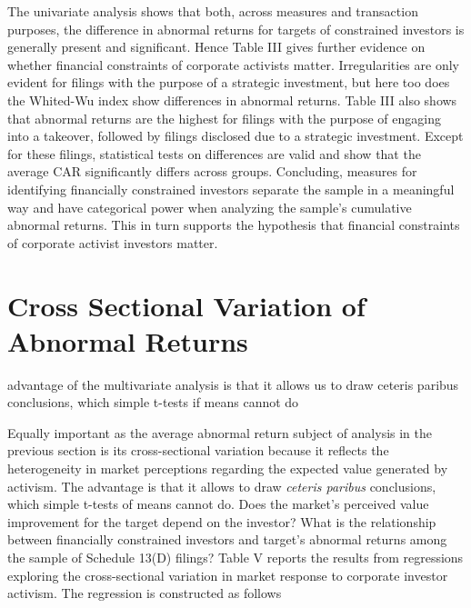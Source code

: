 \documentclass[12pt]{article}
\begin{document}
The univariate analysis shows that both, across measures and transaction purposes, the difference in abnormal returns for targets of constrained investors is generally present and significant. Hence Table III gives further evidence on whether financial constraints of corporate activists matter. Irregularities are only evident for filings with the purpose of a strategic investment, but here too does the Whited-Wu index show differences in abnormal returns. 
Table III also shows that abnormal returns are the highest for filings with the purpose of engaging into a takeover, followed by filings disclosed due to a strategic investment. Except for these filings, statistical tests on differences are valid and show that the average CAR significantly differs across groups. Concluding, measures for identifying financially constrained investors separate the sample in a meaningful way and have categorical power when analyzing the sample's cumulative abnormal returns. This in turn supports the hypothesis that financial constraints of corporate activist investors matter. 


\section{Cross Sectional Variation of Abnormal Returns}

\begin{center}
	advantage of the multivariate analysis is that it allows us to draw ceteris paribus conclusions, which simple t-tests if means cannot do \citep[p.111]{Khatami2014}
\end{center}

Equally important as the average abnormal return subject of analysis in the previous section is its cross-sectional variation because it reflects the heterogeneity in market perceptions regarding the expected value generated by activism. The advantage is that it allows to draw \emph{ceteris paribus} conclusions, which simple t-tests of means cannot do. Does the market's perceived value improvement for the target depend on the investor? What is the relationship between financially constrained investors and target's abnormal returns among the sample of Schedule 13(D) filings? Table V reports the results from regressions exploring the cross-sectional variation in market response to corporate investor activism. The regression is constructed as follows 
\end{document}
